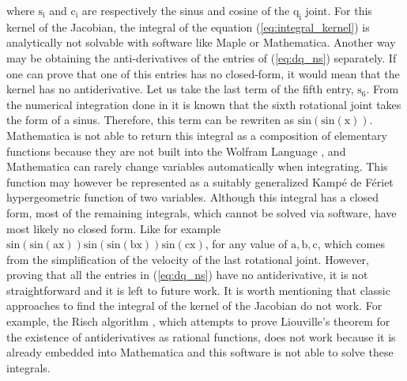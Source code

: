 where $\mathrm{s_i}$ and $\mathrm{c_i}$ are respectively the sinus and cosine of the $\mathrm{q_i}$ joint. For this kernel of the Jacobian, the integral of the equation (\ref{eq:integral_kernel}) is analytically not solvable with software like Maple or Mathematica. 
Another way may be obtaining the anti-derivatives of the entries of (\ref{eq:dq_ns}) separately. If one can prove that one of this entries has no closed-form, it would mean that the kernel has no antiderivative. Let us take the last term of the fifth entry, $\mathrm{s_6}$. From the numerical integration done in  \cite{fabianthesis} it is known that the sixth rotational joint takes the form of a sinus. Therefore, this term can be rewriten as $\mathrm{\mathrm{sin(sin(x))}}$.  
Mathematica is not able to return this integral as a composition of elementary functions because they are not built into the Wolfram Language \cite{wolfram}, and Mathematica can rarely change variables automatically when integrating. This function may however be represented as a suitably generalized Kampé de Fériet hypergeometric function \cite{kampe} of two variables. Although this integral has a closed form, most of the remaining integrals, which cannot be solved via software, have most likely no closed form. Like for example $\mathrm{sin(sin(ax))sin(sin(bx))sin(cx)}$, for any value of $\mathrm{a,b,c}$, which comes from the simplification of the velocity of the last rotational joint. However, proving that all the entries in (\ref{eq:dq_ns}) have no antiderivative, it is not straightforward and it is left to future work. It is worth mentioning that classic approaches to find the integral of the kernel of the Jacobian do not work. For example, the Risch algorithm \cite{risch}, which attempts to prove Liouville's theorem \cite{lioville} for the existence of antiderivatives as rational functions, does not work because it is already embedded into Mathematica and this software is not able to solve these integrals.
 
